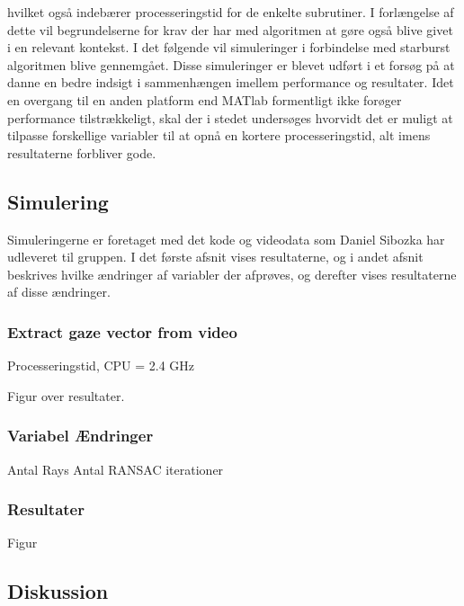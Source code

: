 \documentclass[rapport.tex]{subfiles}
\begin{document}
	 hvilket også indebærer processeringstid for de enkelte subrutiner. I forlængelse af dette vil begrundelserne for krav der har med algoritmen at gøre også blive givet i en relevant kontekst.
	I det følgende vil simuleringer i forbindelse med starburst algoritmen blive gennemgået. Disse simuleringer er blevet udført i et forsøg på at danne en bedre indsigt i sammenhængen imellem performance og resultater. Idet en overgang til en anden platform end MATlab formentligt ikke forøger performance tilstrækkeligt, skal der i stedet undersøges hvorvidt det er muligt at tilpasse forskellige variabler til at opnå en kortere processeringstid, alt imens resultaterne forbliver gode.
	
	\subsection{Simulering}
	
	Simuleringerne er foretaget med det kode og videodata som Daniel Sibozka har udleveret til gruppen. I det første afsnit vises resultaterne, og i andet afsnit beskrives hvilke ændringer af variabler der afprøves, og derefter vises resultaterne af disse ændringer.
	
	\subsubsection{Extract gaze vector from video}
	
	Processeringstid, CPU = 2.4 GHz
	
	Figur over resultater.
	
	\subsubsection{Variabel Ændringer}
	
	Antal Rays
	Antal RANSAC iterationer
	
	
	\subsubsection{Resultater}
	
	Figur 
	\subsection{Diskussion}
		
\end{document}
